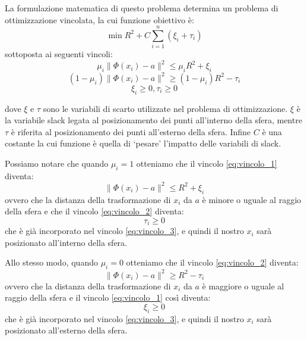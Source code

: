\documentclass[a4paper,12pt]{report}
\begin{document}
La formulazione matematica di questo problema determina un problema di ottimizzazione vincolata, la cui funzione obiettivo è:
\begin{equation*}
    \min R^2 + C\displaystyle\sum_{i=1}^{n}(\xi_i+\tau_i)
    \label{eq:Probela_di_partenza}
\end{equation*}
sottoposta ai seguenti vincoli:
\begin{equation}
    \mu_i\|\Phi(x_i)-a\|^2\le\mu_iR^2 + \xi_i
    \label{eq:vincolo_1}
\end{equation}
\begin{equation}
    (1-\mu_i)\|\Phi(x_i)-a\|^2 \ge (1-\mu_i)R^2 - \tau_i
    \label{eq:vincolo_2}
\end{equation}
\begin{equation}
    \xi_i \ge 0, \tau_i \ge 0
    \label{eq:vincolo_3}
\end{equation}


dove $\xi$ e $\tau$ sono le variabili di scarto utilizzate nel problema di ottimizzazione. $\xi$ è la variabile slack legata al posizionamento dei punti all'interno della sfera, mentre $\tau$ è riferita al posizionamento dei punti all'esterno della sfera. Infine $C$ è una costante la cui funzione è quella di `pesare' l'impatto delle variabili di slack.

Possiamo notare che quando $\mu_i = 1$ otteniamo che il vincolo \ref{eq:vincolo_1} diventa:
\begin{equation*}
    \|\Phi(x_i)-a\|^{2} \le R^2 + \xi_i
\end{equation*}
ovvero che la distanza della trasformazione di $x_i$ da $a$ è minore o uguale al raggio della sfera e che il vincolo \ref{eq:vincolo_2} diventa:
\begin{equation*}
    \tau_i \ge 0
\end{equation*}
che è già incorporato nel vincolo \ref{eq:vincolo_3}, e quindi il nostro $x_i$ sarà posizionato all'interno della sfera.

Allo stesso modo, quando $\mu_i = 0$ otteniamo che il vincolo \ref{eq:vincolo_2} diventa:
\begin{equation*}
    \|\Phi(x_i)-a\|^2 \ge R^2 - \tau_i
\end{equation*}
ovvero che la distanza della trasformazione di $x_i$ da $a$ è maggiore o uguale al raggio della sfera e il vincolo \ref{eq:vincolo_1} così diventa:
\begin{equation*}
    \xi_i \ge 0
\end{equation*}
che è già incorporato nel vincolo \ref{eq:vincolo_3}, e quindi il nostro $x_i$ sarà posizionato all'esterno della sfera.
\end{document}

